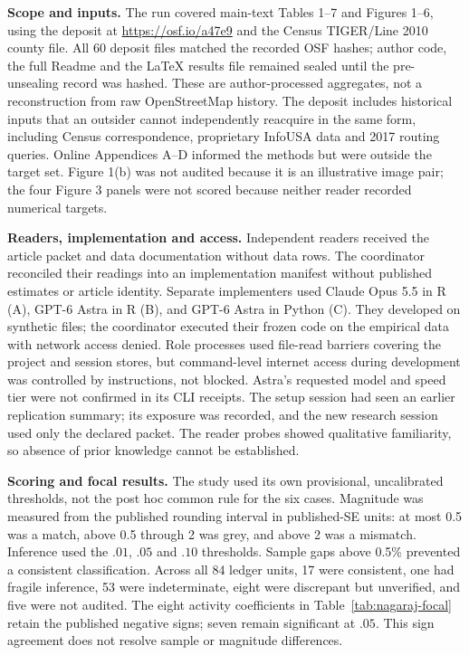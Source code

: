 \documentclass[11pt]{article}
\begin{document}
\textbf{Scope and inputs.} The run covered main-text Tables 1--7 and Figures 1--6, using the deposit at \url{https://osf.io/a47e9} and the Census TIGER/Line 2010 county file. All 60 deposit files matched the recorded OSF hashes; author code, the full Readme and the LaTeX results file remained sealed until the pre-unsealing record was hashed. These are author-processed aggregates, not a reconstruction from raw OpenStreetMap history. The deposit includes historical inputs that an outsider cannot independently reacquire in the same form, including Census correspondence, proprietary InfoUSA data and 2017 routing queries. Online Appendices A--D informed the methods but were outside the target set. Figure 1(b) was not audited because it is an illustrative image pair; the four Figure 3 panels were not scored because neither reader recorded numerical targets.

\textbf{Readers, implementation and access.} Independent readers received the article packet and data documentation without data rows. The coordinator reconciled their readings into an implementation manifest without published estimates or article identity. Separate implementers used Claude Opus 5.5 in R (A), GPT-6 Astra in R (B), and GPT-6 Astra in Python (C). They developed on synthetic files; the coordinator executed their frozen code on the empirical data with network access denied. Role processes used file-read barriers covering the project and session stores, but command-level internet access during development was controlled by instructions, not blocked. Astra's requested model and speed tier were not confirmed in its CLI receipts. The setup session had seen an earlier replication summary; its exposure was recorded, and the new research session used only the declared packet. The reader probes showed qualitative familiarity, so absence of prior knowledge cannot be established.

\textbf{Scoring and focal results.} The study used its own provisional, uncalibrated thresholds, not the post hoc common rule for the six cases. Magnitude was measured from the published rounding interval in published-SE units: at most 0.5 was a match, above 0.5 through 2 was grey, and above 2 was a mismatch. Inference used the $.01$, $.05$ and $.10$ thresholds. Sample gaps above 0.5\% prevented a consistent classification. Across all 84 ledger units, 17 were consistent, one had fragile inference, 53 were indeterminate, eight were discrepant but unverified, and five were not audited. The eight activity coefficients in Table~\ref{tab:nagaraj-focal} retain the published negative signs; seven remain significant at $.05$. This sign agreement does not resolve sample or magnitude differences.
\end{document}
